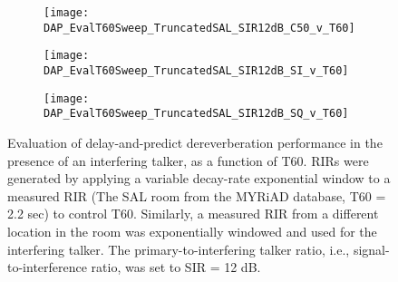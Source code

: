 \begin{figure}[H]
	\centering
	\begin{subfigure}[b]{0.47\textwidth}
		\centering
		\texttt{[image: DAP\_EvalT60Sweep\_TruncatedSAL\_SIR12dB\_C50\_v\_T60]}
	\end{subfigure}
	\begin{subfigure}[b]{0.92\textwidth}
		\centering
		\texttt{[image: DAP\_EvalT60Sweep\_TruncatedSAL\_SIR12dB\_SI\_v\_T60]}
	\end{subfigure}
	\begin{subfigure}[b]{0.92\textwidth}
		\centering
		\texttt{[image: DAP\_EvalT60Sweep\_TruncatedSAL\_SIR12dB\_SQ\_v\_T60]}
	\end{subfigure}
	\caption{Evaluation of delay-and-predict dereverberation performance in the presence of an interfering talker, as a function of T60. RIRs were generated by applying a variable decay-rate exponential window to a measured RIR (The SAL room from the MYRiAD database, T60 = 2.2 sec) to control T60. Similarly, a measured RIR from a different location in the room was exponentially windowed and used for the interfering talker. The primary-to-interfering talker ratio, i.e., signal-to-interference ratio, was set to SIR = 12 dB.}
	\label{fig:DAP_EvalT60Sweep_TruncatedSAL_SIR12dB}
\end{figure}


